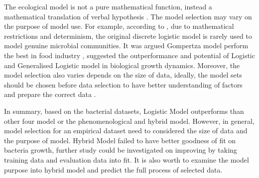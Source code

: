 \documentclass[a4paper]{report}
\begin{document}
\begin{linenumbers}
    The ecological model is not a pure mathematical function, instead a mathematical translation of verbal hypothesis \citep{johnson2004model}. The model selection may vary on the purpose of model use. For example, according to \citet{peleg1997modeling}, due to mathematical restrictions and determinism, the original discrete logistic model is rarely used to model genuine microbial communities. It was argued Gompertza model perform the best in food industry \citep{zwietering1990modeling, ross2003modeling, tjorve2017use}, \citet{tsoularis2002analysis} suggested the outperformance and potential of Logistic and Generalised Logistic model in biological growth dynamics. Moreover, the model selection also varies depends on the size of data, ideally, the model sets should be chosen before data selection to have better understanding of factors and prepare the correct data \citep{johnson2004model}. 
    
    In summary, based on the bacterial datasets, Logistic Model outperforms than other four model or the phenomenological and hybrid model. However, in general, model selection for an empirical dataset need to considered the size of data and the purpose of model. Hybrid Model failed to have better goodness of fit on bacteria growth, further study could be investigated on improving by taking training data and evaluation data into fit. It is also worth to examine the model purpose into hybrid model and predict the full process of selected data. 
    

    
    
    
\end{linenumbers}
\end{document}
